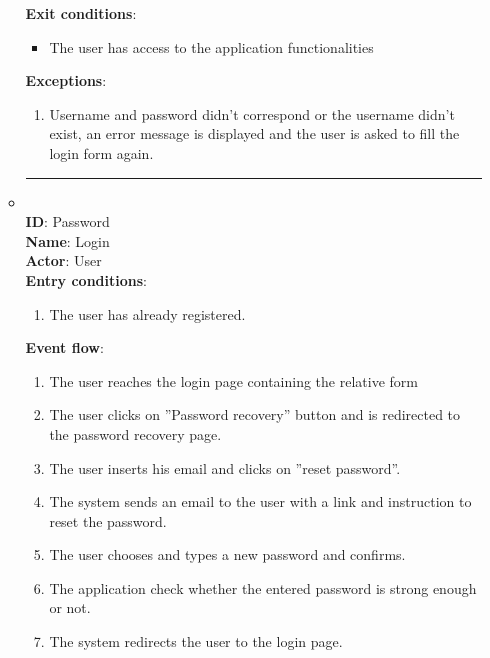 \begin{enumerate}
\begin{itemize}
\begin{enumerate}
		\end{enumerate}
		\textbf{Exit conditions}:
		\begin{itemize}
			\item{The user has access to the application functionalities}
		\end{itemize}
		\textbf{Exceptions}:
		\begin{enumerate}
      		\item{Username and password didn’t correspond or the username didn’t exist, an error message is displayed and the user is asked to ﬁll the login form again.}
 		   \end{enumerate}
		\rule{\linewidth}{0.4pt}
    \item{  } \\
		\textbf{ID}: \Recover Password  \\
		\textbf{Name}: Login \\
		\textbf{Actor}: User \\
		\textbf{Entry conditions}:
		\begin{enumerate}
			\item{The user has already registered.}
		\end{enumerate}
		\textbf{Event flow}:
		\begin{enumerate}
			\item{The user reaches the login page containing the relative form}
			\item{The user clicks on ”Password recovery” button and is redirected to the password recovery page.}
			\item{The user inserts his email and clicks on ”reset password”.}
			\item{The system sends an email to the user with a link and instruction to reset the password.}
			\item{The user chooses and types a new password and conﬁrms.}
			\item{The application check whether the entered password is strong enough or not.}
			\item{The system redirects the user to the login page.}


\end{enumerate}
\end{itemize}
\end{enumerate}
